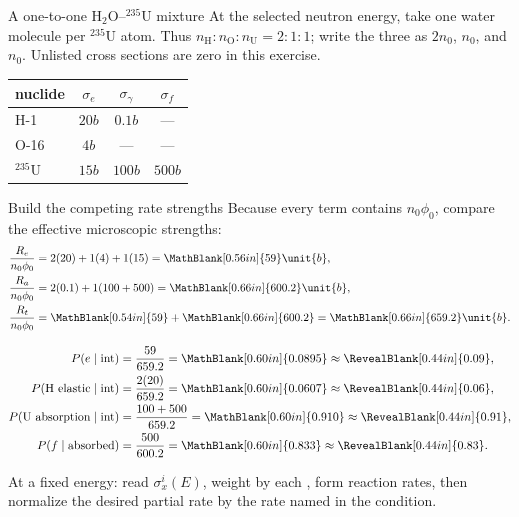 \begin{handoutcolumns}
\switchcolumn


\begin{fixedbox}{A one-to-one $\mathrm{H_2O}$--${}^{235}\mathrm{U}$ mixture}
At the selected neutron energy, take one water molecule per ${}^{235}$U atom.
Thus $n_{\mathrm H}:n_{\mathrm O}:n_{\mathrm U}=2:1:1$; write the three as
$2n_0$, $n_0$, and $n_0$. Unlisted cross sections are zero in this exercise.

\smallskip
\centering\scriptsize
\begin{tabular}{@{}lccc@{}}
\toprule
nuclide & $\sigma_e$ & $\sigma_\gamma$ & $\sigma_f$ \\
\midrule
H-1 & $20\unit{b}$ & $0.1\unit{b}$ & --- \\
O-16 & $4\unit{b}$ & --- & --- \\
${}^{235}$U & $15\unit{b}$ & $100\unit{b}$ & $500\unit{b}$ \\
\bottomrule
\end{tabular}
\normalsize
\end{fixedbox}

\begin{boardbox}{Build the competing rate strengths}
Because every term contains $n_0\phi_0$, compare the effective microscopic
strengths:
\footnotesize
\begin{align*}
 \frac{R_e}{n_0\phi_0}
   &=2(20)+1(4)+1(15)=\MathBlank[0.56in]{59}\unit{b},\\
 \frac{R_a}{n_0\phi_0}
   &=2(0.1)+1(100+500)=\MathBlank[0.66in]{600.2}\unit{b},\\
 \frac{R_t}{n_0\phi_0}
   &=\MathBlank[0.54in]{59}+\MathBlank[0.66in]{600.2}
     =\MathBlank[0.66in]{659.2}\unit{b}.
\end{align*}
\normalsize
\end{boardbox}

\begin{checkpoint}
\footnotesize
\begin{align*}
 P(e\mid\mathrm{int})
   &=\frac{59}{659.2}=\MathBlank[0.60in]{0.0895}\approx\RevealBlank[0.44in]{0.09},\\
 P(\mathrm{H\ elastic}\mid\mathrm{int})
   &=\frac{2(20)}{659.2}=\MathBlank[0.60in]{0.0607}\approx\RevealBlank[0.44in]{0.06},\\
 P(\mathrm{U\ absorption}\mid\mathrm{int})
   &=\frac{100+500}{659.2}=\MathBlank[0.60in]{0.910}\approx\RevealBlank[0.44in]{0.91},\\
 P(f\mid\mathrm{absorbed})
   &=\frac{500}{600.2}=\MathBlank[0.60in]{0.833}\approx\RevealBlank[0.44in]{0.83}.
\end{align*}
\normalsize
\end{checkpoint}

\begin{takeawaybox}
At a fixed energy: read $\sigma_x^i(E)$, weight by each
, form reaction rates, then normalize
the desired partial rate by the rate named in the condition.
\end{takeawaybox}

\end{handoutcolumns}

